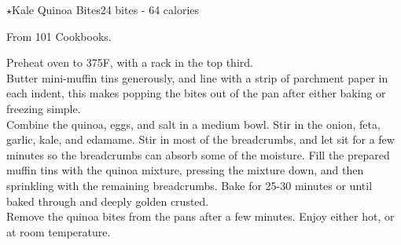 \begin{recipe}{\texorpdfstring{$\star$}{str}Kale Quinoa Bites}{24 bites - 64 calories}{}

\freeform From 101 Cookbooks.


Preheat oven to 375F, with a rack in the top third.\\

Butter mini-muffin tins generously, and line with a strip of parchment paper in each indent, this makes popping the bites out of the pan after either baking or freezing simple.\\

Combine the quinoa, eggs, and salt in a medium bowl. Stir in the onion, feta, garlic, kale, and edamame. Stir in most of the breadcrumbs, and let sit for a few minutes so the breadcrumbs can absorb some of the moisture. Fill the prepared muffin tins with the quinoa mixture, pressing the mixture down, and then sprinkling with the remaining breadcrumbs. Bake for 25-30 minutes or until baked through and deeply golden crusted.\\

Remove the quinoa bites from the pans after a few minutes. Enjoy either hot, or at room temperature.

\end{recipe}